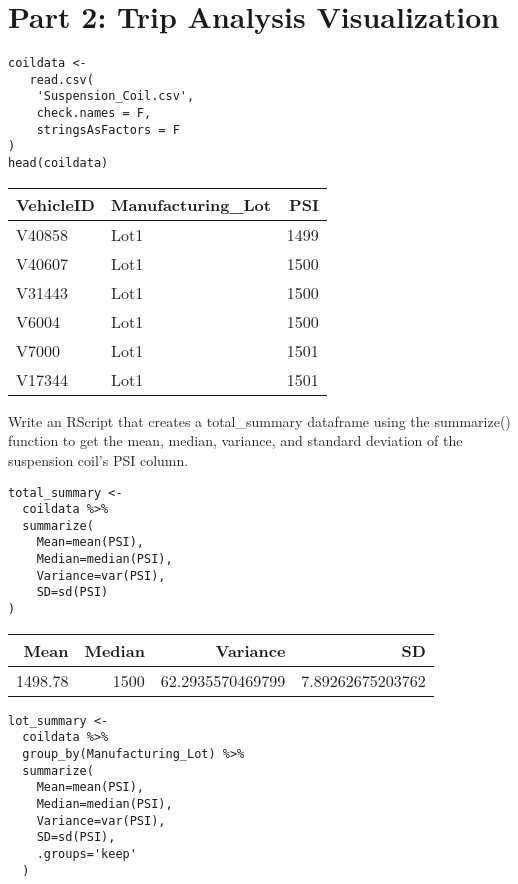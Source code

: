 \documentclass[11pt]{article}
\begin{document}
\section{Part 2: Trip Analysis Visualization}
\label{sec:org941adcf}

\begin{verbatim}
coildata <-
   read.csv(
    'Suspension_Coil.csv',
    check.names = F,
    stringsAsFactors = F
)
head(coildata)
\end{verbatim}

\begin{org}
\begin{center}
\begin{tabular}{llr}
VehicleID & Manufacturing\_Lot & PSI\\
\hline
V40858 & Lot1 & 1499\\
V40607 & Lot1 & 1500\\
V31443 & Lot1 & 1500\\
V6004 & Lot1 & 1500\\
V7000 & Lot1 & 1501\\
V17344 & Lot1 & 1501\\
\end{tabular}
\end{center}
\end{org}

Write an RScript that creates a total\_summary dataframe using the summarize() function to get the mean, median, variance, and standard deviation of the suspension coil’s PSI column.\\

\begin{verbatim}
total_summary <-
  coildata %>%
  summarize(
    Mean=mean(PSI),
    Median=median(PSI),
    Variance=var(PSI),
    SD=sd(PSI)
)
\end{verbatim}

\begin{org}
\begin{center}
\begin{tabular}{rrrr}
Mean & Median & Variance & SD\\
\hline
1498.78 & 1500 & 62.2935570469799 & 7.89262675203762\\
\end{tabular}
\end{center}
\end{org}

\begin{verbatim}
lot_summary <-
  coildata %>%
  group_by(Manufacturing_Lot) %>%
  summarize(
    Mean=mean(PSI),
    Median=median(PSI),
    Variance=var(PSI),
    SD=sd(PSI),
    .groups='keep'
  )
\end{verbatim}
\end{document}
